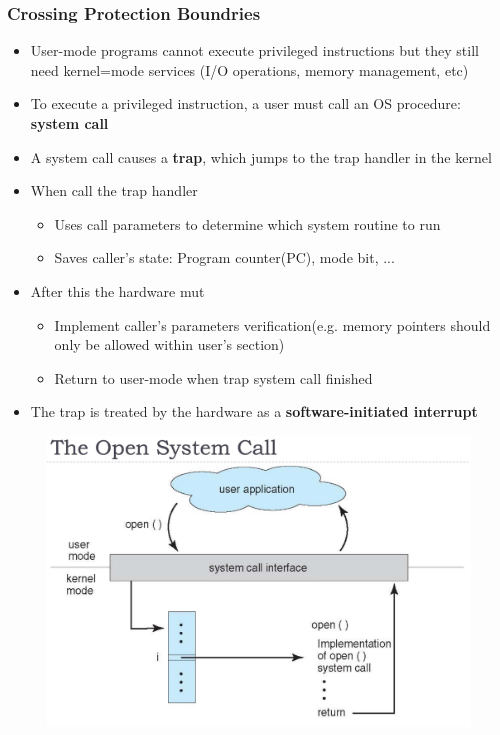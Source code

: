 \documentclass[11pt]{article}
\theoremstyle{definition}
\begin{document}
            \subsubsection{Crossing Protection Boundries}
                \begin{itemize}
                    \item User-mode programs cannot execute privileged instructions but they still need kernel=mode services (I/O operations, memory management, etc)
                    \item To execute a privileged instruction, a user must call an OS procedure: \textbf{system call}
                    \item A system call causes a \textbf{trap}, which jumps to the trap handler in the kernel
                    \item When call the trap handler
                        \begin{itemize}
                            \item Uses call parameters to determine which system routine to run
                            \item Saves caller's state: Program counter(PC), mode bit, ...
                        \end{itemize}
                    \item After this the hardware mut
                        \begin{itemize}
                            \item Implement caller's parameters verification(e.g. memory pointers should only be allowed within user's section)
                            \item Return to user-mode when trap system call finished
                        \end{itemize}
                    \item The trap is treated by the hardware as a \textbf{software-initiated interrupt}
                \end{itemize}
                \clearpage
                \begin{figure}[t]
                \centering
                \includegraphics[width=0.6\linewidth]{Operating System/img/open_system_call.jpg}
        
            \end{figure}
\end{document}

